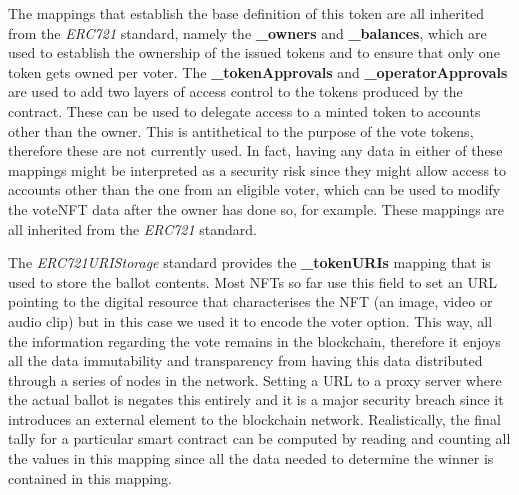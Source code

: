 \documentclass[../main.tex]{subfiles}
\begin{document}
The mappings that establish the base definition of this token are all inherited from the \textit{ERC721} standard, namely the \textbf{\_owners} and \textbf{\_balances}, which are used to establish the ownership of the issued tokens and to ensure that only one token gets owned per voter.
The \textbf{\_tokenApprovals} and \textbf{\_operatorApprovals} are used to add two layers of access control to the tokens produced by the contract. These can be used to delegate access to a minted token to accounts other than the owner. This is antithetical to the purpose of the vote tokens, therefore these are not currently used. In fact, having any data in either of these mappings might be interpreted as a security risk since they might allow access to accounts other than the one from an eligible voter, which can be used to modify the voteNFT data after the owner has done so, for example. These mappings are all inherited from the \textit{ERC721} standard.
\par
The \textit{ERC721URIStorage} standard provides the \textbf{\_tokenURIs} mapping that is used to store the ballot contents. Most NFTs so far use this field to set an URL pointing to the digital resource that characterises the NFT (an image, video or audio clip) but in this case we used it to encode the voter option. This way, all the information regarding the vote remains in the blockchain, therefore it enjoys all the data immutability and transparency from having this data distributed through a series of nodes in the network. Setting a URL to a proxy server where the actual ballot is negates this entirely and it is a major security breach since it introduces an external element to the blockchain network. Realistically, the final tally for a particular smart contract can be computed by reading and counting all the values in this mapping since all the data needed to determine the winner is contained in this mapping.
\par
\end{document}
